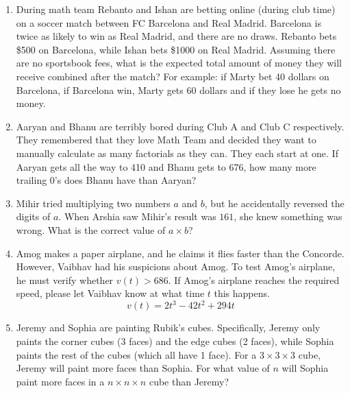 \documentclass[a4paper]{article}
\begin{document}
\begin{enumerate}[itemsep=4cm]
    \pagebreak
    \item During math team Rebanto and Ishan are betting online (during club time) on a soccer match between FC Barcelona and Real Madrid. Barcelona is twice as likely to win as Real Madrid, and there are no draws. Rebanto bets \$500 on Barcelona, while Ishan bets \$1000 on Real Madrid. Assuming there are no sportsbook fees, what is the expected total amount of money they will receive combined after the match? For example: if Marty bet 40 dollars on Barcelona, if Barcelona win, Marty gets 60 dollars and if they lose he gets no money.
    \vspace{-2cm}
    \item Aaryan and Bhanu are terribly bored during Club A and Club C respectively. They remembered that they love Math Team and decided they want to manually calculate as many factorials as they can. They each start at one. If Aaryan gets all the way to 410 and Bhanu gets to 676, how many more trailing 0's does Bhanu have than Aaryan?
    \item Mihir tried multiplying two numbers $a$ and $b$, but he accidentally reversed the digits of $a$. When Arshia saw Mihir's result was $161$, she knew something was wrong. What is the correct value of $a\times b$?
    \item Amog makes a paper airplane, and he claims it flies faster than the Concorde. However, Vaibhav had his suspicions about Amog. To test Amog's airplane,  he must verify whether $v(t)>686$. If Amog's airplane reaches the required speed, please let Vaibhav know at what time $t$ this happens.
    $$v(t)=2t^3-42t^2+294t$$
    \item Jeremy and Sophia are painting Rubik's cubes. Specifically, Jeremy only paints the corner cubes (3 faces) and the edge cubes (2 faces), while Sophia paints the rest of the cubes (which all have 1 face). For a $3\times3\times 3$ cube, Jeremy will paint more faces than Sophia. For what value of $n$ will Sophia paint more faces in a $n\times n\times n$ cube than Jeremy?
\end{enumerate}
\end{document}
